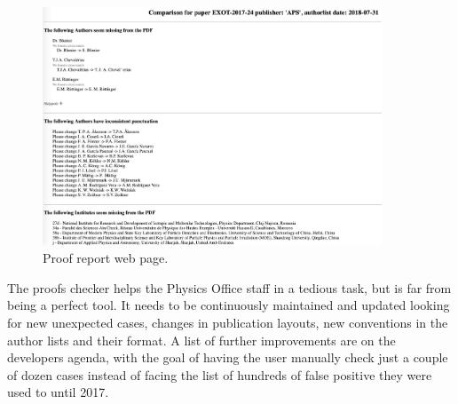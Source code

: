 \begin{figure}[htb]
  \centering
  \includegraphics[width=0.9\textwidth]{figures/proof_report_webpage.png}
  \caption{Proof report web page.}
  \label{fig:proof_report_webpage}
\end{figure}

The proofs checker helps the Physics Office staff in a tedious task, but is far from being a perfect tool.
It needs to be continuously maintained and updated looking for new unexpected cases,
changes in publication layouts, new conventions in the author lists and their format.
A list of further improvements are on the developers agenda,
with the goal of having the user manually check just a couple of dozen cases instead of facing the list of hundreds of false positive they were used to until 2017.
